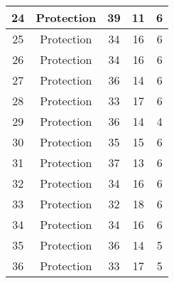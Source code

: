 \documentclass[results.tex]{subfiles}
\begin{document}
\begin{center}
\begin{tabular}{| c || c | c | c | c |}
            \hline
            24                      & Protection                   & 39                     & 11                      & 6                    \\
            \hline
            25                      & Protection                   & 34                     & 16                      & 6                    \\
            \hline
            26                      & Protection                   & 34                     & 16                      & 6                    \\
            \hline
            27                      & Protection                   & 36                     & 14                      & 6                    \\
            \hline
            28                      & Protection                   & 33                     & 17                      & 6                    \\
            \hline
            29                      & Protection                   & 36                     & 14                      & 4                    \\
            \hline
            30                      & Protection                   & 35                     & 15                      & 6                    \\
            \hline
            31                      & Protection                   & 37                     & 13                      & 6                    \\
            \hline
            32                      & Protection                   & 34                     & 16                      & 6                    \\
            \hline
            33                      & Protection                   & 32                     & 18                      & 6                    \\
            \hline
            34                      & Protection                   & 34                     & 16                      & 6                    \\
            \hline
            35                      & Protection                   & 36                     & 14                      & 5                    \\
            \hline
            36                      & Protection                   & 33                     & 17                      & 5                    \\

\end{tabular}
\end{center}
\end{document}
